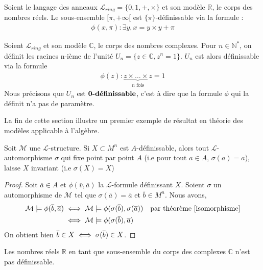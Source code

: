 \begin{exem}
Soient le langage des anneaux $\mathcal{L}_{ring} = \{0, 1, +, \times\}$ et son modèle $\mathbb{R}$, le corps des nombres réels.
Le sous-ensemble $[\pi, +\infty [{}$ est $\{\pi\}$-définissable via la formule :
\begin{align*}
\phi(x, \pi) : \exists y, x = y \times y + \pi
\end{align*}
\end{exem}

\begin{exem}
Soient $\mathcal{L}_{ring}$ et son modèle $\mathbb{C}$, le corps des nombres complexes.
Pour $n \in \mathbb{N}^*$, on définit les racines n-ième de l'unité $U_n = \{z \in \mathbb{C}, z^n = 1 \}$.
$U_n$ est alors définissable via la formule 
\begin{align*}
\phi(z): \underbrace{z \times \dots \times z}_{n \text{ fois}} = 1
\end{align*}
Nous précisons que $U_n$ est $\textbf{0-définissable}$, c'est à dire que la formule $\phi$ qui la définit n'a pas de paramètre.
\end{exem}

La fin de cette section illustre un premier exemple de résultat en théorie des modèles applicable à l'algèbre.

\begin{prop}\label{pointwise}
Soit $\mathcal{M}$ une $\mathcal{L}$-structure. Si $X \subset M^n$ est $A$-définissable, alors tout $\mathcal{L}$-automorphisme $\sigma$
qui fixe point par point $A$ (i.e pour tout $a \in A$, $\sigma(a) = a$), laisse $X$ invariant (i.e $\sigma(X)=X$)
\end{prop}

\begin{proof}
Soit $\overline{a} \in A$ et $\phi(\overline{v}, \overline{a})$ la $\mathcal{L}$-formule définissant $X$.
Soient $\sigma$ un automorphisme de $\mathcal{M}$ tel que $\sigma(\overline{a}) = \overline{a}$ et $\overline{b} \in M^n$.
Nous avons, 
\begin{align*}
\mathcal{M} \models \phi(\overline{b}, \overline{a}) &\iff \mathcal{M} \models \phi(\sigma(\overline{b}), \sigma(\overline{a})) 
&& \text{par théorème } \ref{isomorphisme}\\
&\iff \mathcal{M} \models \phi(\sigma(\overline{b}), \overline{a})
\end{align*}
On obtient bien $\overline{b} \in X \iff \sigma(\overline{b}) \in X$.
\end{proof}

\begin{coro}
Les nombres réels $\mathbb{R}$ en tant que sous-ensemble du corps des complexes $\mathbb{C}$ n'est pas définissable.
\end{coro}

